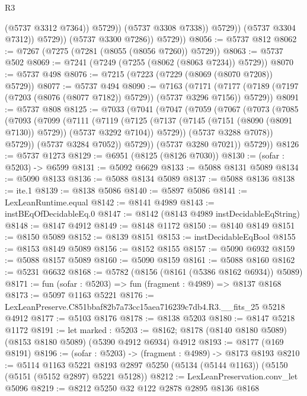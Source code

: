 \begin{lexlean}{R3}
\begin{coremodule}
                            (@5737 @3312 @7364))
                          @5729))
                      (@5737 @3308 @7338))
                    @5729))
                (@5737 @3304 @7312))
              @5729))
          (@5737 @3300 @7286))
        @5729))
@8056 := @5737 @812
@8062 := @7267 (@7275 (@7281 (@8055 (@8056 @7260)) @5729))
@8063 := @5737 @502
@8069 := @7241 (@7249 (@7255 (@8062 (@8063 @7234)) @5729))
@8070 := @5737 @498
@8076 := @7215 (@7223 (@7229 (@8069 (@8070 @7208)) @5729))
@8077 := @5737 @494
@8090 := @7163
    (@7171 (@7177 (@7189 (@7197 (@7203 (@8076 (@8077 @7182)) @5729)) (@5737 @3296 @7156)) @5729))
@8091 := @5737 @808
@8125 := @7033
    (@7041
      (@7047
        (@7059
          (@7067
            (@7073
              (@7085
                (@7093
                  (@7099
                    (@7111
                      (@7119
                        (@7125
                          (@7137 (@7145 (@7151 (@8090 (@8091 @7130)) @5729)) (@5737 @3292 @7104))
                          @5729))
                      (@5737 @3288 @7078))
                    @5729))
                (@5737 @3284 @7052))
              @5729))
          (@5737 @3280 @7021))
        @5729))
@8126 := @5737 @1273
@8129 := @6951 (@8125 (@8126 @7030))
@8130 := (sofar : @5203) -> @6599
@8131 := @5092 @6629
@8133 := @5088 @8131 @5089
@8134 := @5090 @8133
@8136 := @5088 @8134 @5089
@8137 := @5088 @8136
@8138 := ite.{1}
@8139 := @8138 @5086
@8140 := @5897 @5086
@8141 := LexLeanRuntime.equal
@8142 := @8141 @4989
@8143 := instBEqOfDecidableEq.{0}
@8147 := @8142 (@8143 @4989 instDecidableEqString)
@8148 := @8147 @4912
@8149 := @8148 @1172
@8150 := @8140 @8149
@8151 := @8150 @5089
@8152 := @8139 @8151
@8153 := instDecidableEqBool
@8155 := @8153 @8149 @5089
@8156 := @8152 @8155
@8157 := @5090 @6932
@8159 := @5088 @8157 @5089
@8160 := @5090 @8159
@8161 := @5088 @8160
@8162 := @5231 @6632
@8168 := @5782 (@8156 (@8161 (@5386 @8162 @6934)) @5089)
@8171 := fun (sofar : @5203) => fun (fragment : @4989) => @8137 @8168
@8173 := @5097 @1163 @5221
@8176 := LexLeanPreserve.C851bbaf82b7a73cc15aea716239c7db4.R3.__fits_25 @5218 @4912
@8177 := @5103 @8176
@8178 := @8138 @5203
@8180 := @8147 @5218 @1172
@8191 := let marked : @5203 := @8162;
  @8178 (@8140 @8180 @5089) (@8153 @8180 @5089) (@5390 @4912 @6934) @4912
@8193 := @8177 (@169 @8191)
@8196 := (sofar : @5203) -> (fragment : @4989) -> @8173 @8193
@8210 := @5114
    @1163
    @5221
    @8193
    @2897
    @5250
    (@5134 (@5144 @1163))
    (@5150 (@5151 (@5152 @2897) @5221 @5128))
@8212 := LexLeanPreservation.conv_let @5096
@8219 := @8212 @5250 @32 @122 @2878 @2895 @8136 @8168

\end{coremodule}
\end{lexlean}
